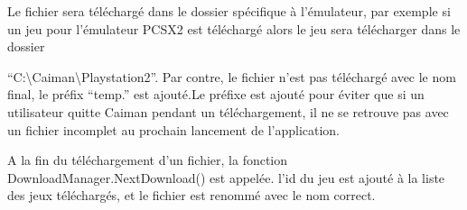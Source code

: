 \documentclass[a4paper,12pt,french]{sphinxmanual}
\begin{document}
\begin{sphinxVerbatim}[commandchars=\\\{\}]
  
            
             
                   
                      
                  
                  
\end{sphinxVerbatim}

\sphinxAtStartPar
Le fichier sera téléchargé dans le dossier spécifique à l’émulateur, par exemple si un jeu pour l’émulateur PCSX2 est téléchargé alors le jeu sera télécharger dans le dossier

\sphinxAtStartPar
“C:\textbackslash{}Caiman\textbackslash{}Playstation2”. Par contre, le fichier n’est pas téléchargé avec le nom final, le préfix “temp.” est ajouté.Le préfixe est ajouté pour éviter que si un utilisateur quitte Caiman pendant un téléchargement, il ne se retrouve pas avec un fichier incomplet au prochain lancement de l’application.

\sphinxAtStartPar
A la fin du téléchargement d’un fichier, la fonction DownloadManager.NextDownload() est appelée. l’id du jeu est ajouté à la liste des jeux téléchargés, et le fichier est renommé avec le nom correct.
\end{document}
